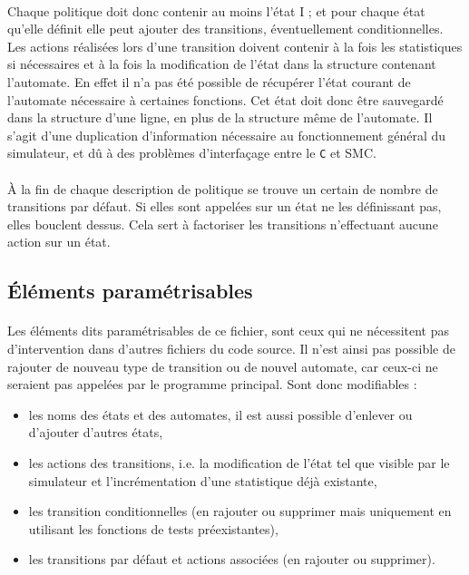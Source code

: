 \paragraph{}
Chaque politique doit donc contenir au moins l'état I ; et pour chaque état qu'elle définit elle peut ajouter des transitions, éventuellement conditionnelles. Les actions réalisées lors d'une transition doivent contenir à la fois les statistiques si nécessaires et à la fois la modification de l'état dans la structure contenant l'automate. En effet il n'a pas été possible de récupérer l'état courant de l'automate nécessaire à certaines fonctions. Cet état doit donc être sauvegardé dans la structure d'une ligne, en plus de la structure même de l'automate. Il s'agit d'une duplication d'information nécessaire au fonctionnement général du simulateur, et dû à des problèmes d'interfaçage entre le \texttt{C} et \textsf{SMC}.

\paragraph{}
\`A la fin de chaque description de politique se trouve un certain de nombre de transitions par défaut. Si elles sont appelées sur un état ne les définissant pas, elles bouclent dessus. Cela sert à factoriser les transitions n'effectuant aucune action sur un état.

\subsection{\'Eléments paramétrisables}

\paragraph{}
Les éléments dits paramétrisables de ce fichier, sont ceux qui ne nécessitent pas d'intervention dans d'autres fichiers du code source. Il n'est ainsi pas possible de rajouter de nouveau type de transition ou de nouvel automate, car ceux-ci ne seraient pas appelées par le programme principal. Sont donc modifiables :
\begin{itemize}
\item{les noms des états et des automates, il est aussi possible d'enlever ou d'ajouter d'autres états,}
\item{les actions des transitions, i.e. la modification de l'état tel que visible par le simulateur et l'incrémentation d'une statistique déjà existante,}
\item{les transition conditionnelles (en rajouter ou supprimer mais uniquement en utilisant les fonctions de tests préexistantes),}
\item{les transitions par défaut et actions associées (en rajouter ou supprimer).}
\end{itemize}

